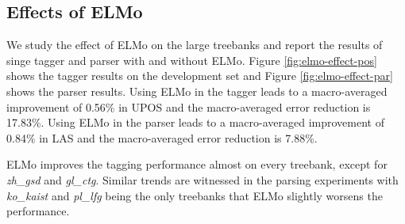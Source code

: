 \documentclass[11pt,a4paper]{article}
\begin{document}
\subsection{Effects of ELMo}

We study the effect of ELMo on the large treebanks and report
the results of singe tagger and parser with and without ELMo.
Figure \ref{fig:elmo-effect-pos} shows the tagger results on the development set
and Figure \ref{fig:elmo-effect-par} 
shows the parser results.
Using ELMo in the tagger leads to a macro-averaged improvement of 0.56\% in UPOS
and the macro-averaged error reduction is 17.83\%.
Using ELMo in the parser leads to a macro-averaged improvement 
of 0.84\% in LAS and
the macro-averaged error reduction is 7.88\%.

ELMo improves the tagging performance almost on every treebank,
except for \textit{zh\_gsd} and \textit{gl\_ctg}.
Similar trends are witnessed in the parsing experiments with \textit{ko\_kaist}
and \textit{pl\_lfg} being the only treebanks that ELMo slightly worsens the performance.
\end{document}
